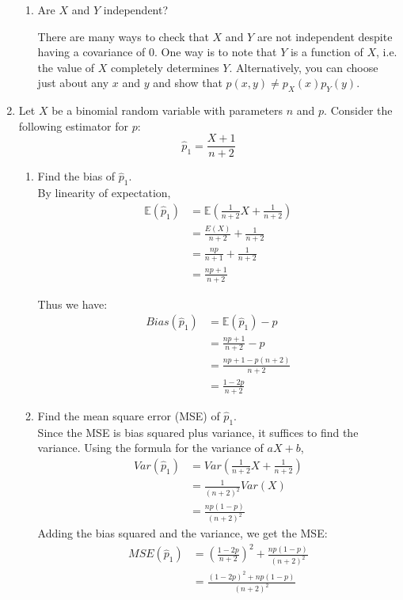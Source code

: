 \documentclass[12pt]{article}
\def\E{{\mathbb E}}
\begin{document}
\begin{enumerate}
\begin{enumerate}
\item Are $X$ and $Y$ independent?

There are many ways to check that $X$ and $Y$ are not independent despite having a covariance of 0. One way is to note that $Y$ is a function of $X$, i.e. the value of $X$ completely determines $Y$. Alternatively, you can choose just about any $x$ and $y$ and show that $p(x,y)\neq p_X(x)p_Y(y)$.
\end{enumerate}

\item Let $X$ be a binomial random variable with parameters $n$ and $p$. Consider the following estimator for $p$:
\[
\hat{p}_1 = \frac{X+1}{n+2}
\]
\begin{enumerate}
\item Find the bias of $\hat{p}_1$.\\

By linearity of expectation,
\begin{align*}
\E(\hat{p}_1) &= \E\left( \frac{1}{n+2}X + \frac{1}{n+2} \right) \\
&= \frac{E(X)}{n+2} + \frac{1}{n+2}\\
&= \frac{np}{n+1} + \frac{1}{n+2}\\
&= \frac{np + 1}{n+2}
\end{align*}

Thus we have:
\begin{align*}
Bias(\hat{p}_1) &= \E(\hat{p}_1) - p \\
&= \frac{np + 1}{n+2} - p \\
&= \frac{np + 1 - p(n+2)}{n+2} \\
&= \frac{1 - 2p}{n+2}
\end{align*}

\item Find the mean square error (MSE) of $\hat{p}_1$.\\

Since the MSE is bias squared plus variance, it suffices to find the variance. Using the formula for the variance of $aX + b$,
\begin{align*}
Var(\hat{p}_1) &= Var\left( \frac{1}{n+2}X + \frac{1}{n+2} \right) \\
&= \frac{1}{(n+2)^2} Var(X) \\
&= \frac{np(1-p)}{(n+2)^2}
\end{align*}
Adding the bias squared and the variance, we get the MSE:
\begin{align*}
MSE(\hat{p}_1) &= \left( \frac{1 - 2p}{n+2} \right)^2 + \frac{np(1-p)}{(n+2)^2} \\
&= \frac{(1-2p)^2 + np(1-p)}{(n+2)^2}
\end{align*}


\end{enumerate}
\end{enumerate}
\end{document}
